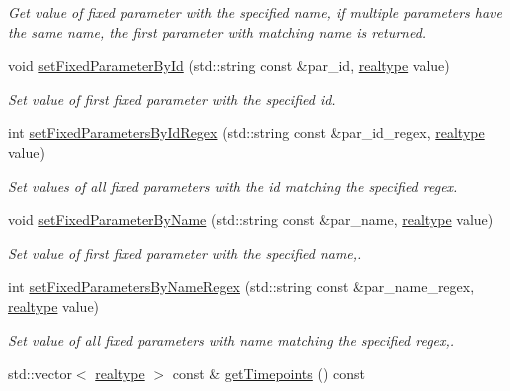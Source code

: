 \begin{DoxyCompactItemize}
\begin{DoxyCompactList}\small\item\em Get value of fixed parameter with the specified name, if multiple parameters have the same name, the first parameter with matching name is returned. \end{DoxyCompactList}\item 
void \mbox{\hyperlink{classamici_1_1_model_adc0d24343c6fed2e797fb402f7c2d256}{set\+Fixed\+Parameter\+By\+Id}} (std\+::string const \&par\+\_\+id, \mbox{\hyperlink{namespaceamici_a1bdce28051d6a53868f7ccbf5f2c14a3}{realtype}} value)
\begin{DoxyCompactList}\small\item\em Set value of first fixed parameter with the specified id. \end{DoxyCompactList}\item 
int \mbox{\hyperlink{classamici_1_1_model_acda9b9debfd3d6ac77e2d27a48bfb5d6}{set\+Fixed\+Parameters\+By\+Id\+Regex}} (std\+::string const \&par\+\_\+id\+\_\+regex, \mbox{\hyperlink{namespaceamici_a1bdce28051d6a53868f7ccbf5f2c14a3}{realtype}} value)
\begin{DoxyCompactList}\small\item\em Set values of all fixed parameters with the id matching the specified regex. \end{DoxyCompactList}\item 
void \mbox{\hyperlink{classamici_1_1_model_af1225439bd6deceb98b224e75a960800}{set\+Fixed\+Parameter\+By\+Name}} (std\+::string const \&par\+\_\+name, \mbox{\hyperlink{namespaceamici_a1bdce28051d6a53868f7ccbf5f2c14a3}{realtype}} value)
\begin{DoxyCompactList}\small\item\em Set value of first fixed parameter with the specified name,. \end{DoxyCompactList}\item 
int \mbox{\hyperlink{classamici_1_1_model_a4802f7d56264e3b592c167da8166cb73}{set\+Fixed\+Parameters\+By\+Name\+Regex}} (std\+::string const \&par\+\_\+name\+\_\+regex, \mbox{\hyperlink{namespaceamici_a1bdce28051d6a53868f7ccbf5f2c14a3}{realtype}} value)
\begin{DoxyCompactList}\small\item\em Set value of all fixed parameters with name matching the specified regex,. \end{DoxyCompactList}\item 
std\+::vector$<$ \mbox{\hyperlink{namespaceamici_a1bdce28051d6a53868f7ccbf5f2c14a3}{realtype}} $>$ const  \& \mbox{\hyperlink{classamici_1_1_model_a50ea5198d117f8f4ad1e34bb279975c8}{get\+Timepoints}} () const

\end{DoxyCompactItemize}
